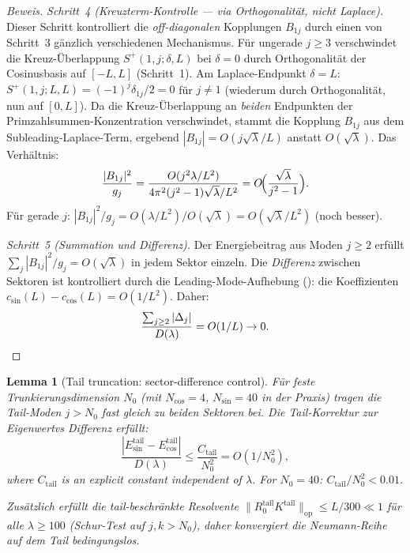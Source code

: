 \documentclass[12pt,a4paper]{article}
\newtheorem{lemma}[theorem]{Lemma}
\theoremstyle{definition}
\theoremstyle{remark}
\begin{document}
\begin{proof}[Beweis]
\emph{Schritt~4 (Kreuzterm-Kontrolle --- via Orthogonalität, nicht Laplace).} Dieser Schritt kontrolliert die \emph{off-diagonalen} Kopplungen $B_{1j}$ durch einen von Schritt~3 gänzlich verschiedenen Mechanismus. Für ungerade $j \geq 3$ verschwindet die Kreuz-Überlappung $S^+(1,j;\delta,L)$ bei $\delta = 0$ durch Orthogonalität der Cosinusbasis auf $[-L,L]$ (Schritt~1). Am Laplace-Endpunkt $\delta = L$: $S^+(1,j;L,L) = (-1)^j\delta_{1j}/2 = 0$ für $j \neq 1$ (wiederum durch Orthogonalität, nun auf $[0,L]$). Da die Kreuz-Überlappung an \emph{beiden} Endpunkten der Primzahlsummen-Konzentration verschwindet, stammt die Kopplung $B_{1j}$ aus dem Subleading-Laplace-Term, ergebend $|B_{1j}| = O(j\sqrt{\lambda}/L)$ anstatt $O(\sqrt{\lambda})$. Das Verhältnis:
\[
  \frac{|B_{1j}|^2}{g_j} = \frac{O(j^2\lambda/L^2)}{4\pi^2(j^2-1)\sqrt{\lambda}/L^2} = O\!\Bigl(\frac{\sqrt{\lambda}}{j^2-1}\Bigr).
\]
Für gerade $j$: $|B_{1j}|^2/g_j = O(\lambda/L^2)/O(\sqrt{\lambda}) = O(\sqrt{\lambda}/L^2)$ (noch besser).

\emph{Schritt~5 (Summation und Differenz).} Der Energiebeitrag aus Moden $j \geq 2$ erfüllt $\sum_j |B_{1j}|^2/g_j = O(\sqrt{\lambda})$ in jedem Sektor einzeln. Die \emph{Differenz} zwischen Sektoren ist kontrolliert durch die Leading-Mode-Aufhebung (): die Koeffizienten $c_{\sin}(L) - c_{\cos}(L) = O(1/L^2)$. Daher:
\[
  \frac{\sum_{j \geq 2}|\Delta_j|}{D(\lambda)} = O(1/L) \to 0. \qedhere
\]
\end{proof}

\begin{lemma}[Tail truncation: sector-difference control]
\label{lem:resolvent-truncation}
Für feste Trunkierungsdimension $N_0$ (mit $N_{\cos} = 4$, $N_{\sin} = 40$ in der Praxis) tragen die Tail-Moden $j > N_0$ fast gleich zu beiden Sektoren bei. Die Tail-Korrektur zur Eigenwertvs \emph{Differenz} erfüllt:
\begin{equation}
\label{eq:tail-diff}
  \frac{|E_{\sin}^{\mathrm{tail}} - E_{\cos}^{\mathrm{tail}}|}{D(\lambda)}
  \leq \frac{C_{\mathrm{tail}}}{N_0^2} = O(1/N_0^2),
\end{equation}
where $C_{\mathrm{tail}}$ is an explicit constant independent of $\lambda$. For $N_0 = 40$: $C_{\mathrm{tail}}/N_0^2 < 0.01$.

Zusätzlich erfüllt die tail-beschränkte Resolvente $\|R_0^{\mathrm{tail}} K^{\mathrm{tail}}\|_{\mathrm{op}} \leq L/300 \ll 1$ für alle $\lambda \geq 100$ (Schur-Test auf $j, k > N_0$), daher konvergiert die Neumann-Reihe auf dem Tail bedingungslos.
\end{lemma}
\end{document}
